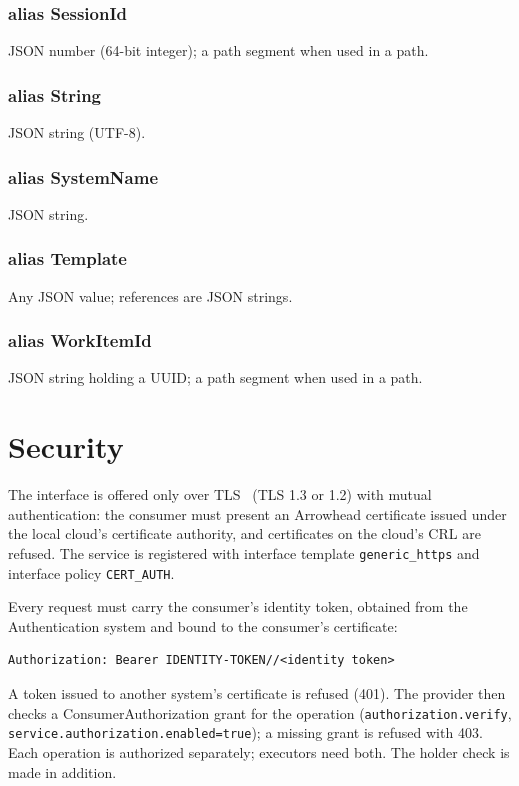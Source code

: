 \documentclass[a4paper]{arrowhead}
\newcommand{\pdef}[1]{{\textcolor{ArrowheadGrey}{#1\label{sec:model:primitives:#1}\label{sec:model:primitives:#1s}}}}
\begin{document}
\subsubsection*{alias \pdef{SessionId}}
JSON number (64-bit integer); a path segment when used in a path.

\subsubsection*{alias \pdef{String}}
JSON string (UTF-8).

\subsubsection*{alias \pdef{SystemName}}
JSON string.

\subsubsection*{alias \pdef{Template}}
Any JSON value; references are JSON strings.

\subsubsection*{alias \pdef{WorkItemId}}
JSON string holding a UUID; a path segment when used in a path.



\section{Security}
\label{sec:security}
The interface is offered only over TLS~\cite{rfc8446} (TLS 1.3 or 1.2) with mutual authentication: the consumer must
present an Arrowhead certificate issued under the local cloud's certificate authority, and certificates on the
cloud's CRL are refused. The service is registered with interface template \texttt{generic\_https} and interface
policy \texttt{CERT\_AUTH}.

Every request must carry the consumer's identity token, obtained from the Authentication system and bound to the
consumer's certificate:
\begin{lstlisting}
Authorization: Bearer IDENTITY-TOKEN//<identity token>
\end{lstlisting}
A token issued to another system's certificate is refused (401). The provider then checks a ConsumerAuthorization
grant for the operation (\texttt{authorization.verify}, \texttt{service.authorization.enabled=true}); a missing grant is
refused with 403. Each operation is authorized separately; executors need both. The holder check is made in addition.
\end{document}
